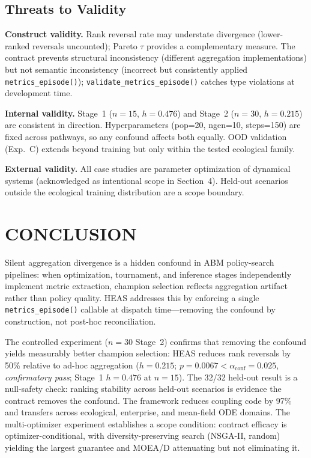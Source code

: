 \documentclass{wscpaperproc}
\begin{document}
\subsection{Threats to Validity}

\textbf{Construct validity.} Rank reversal rate may understate divergence
(lower-ranked reversals uncounted); Pareto $\tau$ provides a complementary
measure. The contract prevents structural inconsistency (different aggregation
implementations) but not semantic inconsistency (incorrect but consistently
applied \texttt{metrics\_episode()}); \texttt{validate\_metrics\_episode()}
catches type violations at development time.

\textbf{Internal validity.} Stage~1 ($n\!=\!15$, $h\!=\!0.476$) and Stage~2 ($n\!=\!30$, $h\!=\!0.215$)
are consistent in direction. Hyperparameters (pop=20, ngen=10, steps=150) are
fixed across pathways, so any confound affects both equally. OOD validation
(Exp.~C) extends beyond training but only within the tested ecological family.

\textbf{External validity.} All case studies are parameter optimization of
dynamical systems (acknowledged as intentional scope in Section~4). Held-out scenarios outside the ecological
training distribution are a scope boundary.

\section{CONCLUSION}

Silent aggregation divergence is a hidden confound in ABM policy-search
pipelines: when optimization, tournament, and inference stages independently
implement metric extraction, champion selection reflects aggregation artifact
rather than policy quality. HEAS addresses this by enforcing a single
\texttt{metrics\_episode()} callable at dispatch time---removing the confound by
construction, not post-hoc reconciliation.

The controlled experiment ($n\!=\!30$ Stage~2) confirms that
removing the confound yields measurably better champion selection: HEAS reduces
rank reversals by 50\% relative to ad-hoc aggregation ($h\!=\!0.215$;
$p\!=\!0.0067 < \alpha_{\text{conf}}\!=\!0.025$, \emph{confirmatory pass};
Stage~1 $h\!=\!0.476$ at $n\!=\!15$). The 32/32 held-out result is a
null-safety check: ranking stability across held-out scenarios is evidence the
contract removes the confound. The framework reduces coupling code by 97\% and
transfers across ecological, enterprise, and mean-field ODE domains. The
multi-optimizer experiment establishes a scope condition: contract efficacy is
optimizer-conditional, with diversity-preserving search (NSGA-II, random)
yielding the largest guarantee and MOEA/D attenuating but not eliminating it.
\end{document}
